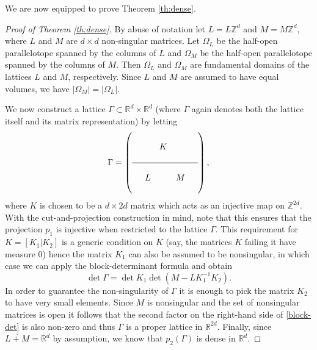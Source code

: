 \documentclass[12pt,a4paper,oneside]{amsart}
\theoremstyle{plain}
\theoremstyle{definition}
\newcommand{\RR}{{\mathbb R}}
\newcounter{rem}
\begin{document}
We are now equipped to prove Theorem \ref{th:dense}.
\begin{proof}[Proof of Theorem \ref{th:dense}]
By abuse of notation let $L=L\mathbb{Z}^d$ and $M=M\mathbb{Z}^d$, where $L$ and $M$ are $d\times d$ non-singular matrices. Let $\Omega_L$ be the half-open parallelotope spanned by the columns of $L$ and $\Omega_M$ be the half-open parallelotope spanned by the columns of $M$. Then $\Omega_L$ and $\Omega_M$ are fundamental domains of the lattices $L$ and $M$, respectively. Since $L$ and $M$ are assumed to have equal volumes, we have $|\Omega_M| = |\Omega_L|$.

We now construct a lattice $\Gamma \subset \mathbb{R}^d \times \mathbb{R}^d$ (where $\Gamma$ again denotes both the lattice itself and its matrix representation) by letting
\begin{equation*}
\Gamma = 
\left(
\begin{array}{c c c c c}
\\
& & K & & \\
\\
 \hline
 \\
& L &  & M & \\ 
 \\
\end{array}
\right),
\end{equation*}
where $K$ is chosen to be a $d \times 2d$ matrix which acts as an injective map on $\mathbb{Z}^{2d}$. With the cut-and-projection construction in mind, note that this ensures that the projection $p_1$ is injective when restricted to the lattice $\Gamma$. This requirement for $K = [K_1 | K_2]$ is a generic condition on $K$ (say, the matrices $K$ failing it have measure $0$) hence the matrix $K_1$ can also be assumed to be nonsingular, in which case we can apply the block-determinant formula and obtain
\begin{equation}\label{block-det}
\det\Gamma = \det K_1 \det(M-L K_1^{-1} K_2).
\end{equation}
In order to guarantee the non-singularity of $\Gamma$ it is enough to pick the matrix $K_2$ to have very small elements. Since $M$ is nonsingular and the set of nonsingular matrices is open it follows that the second factor on the right-hand side of  \eqref{block-det} is also non-zero and thus $\Gamma$ is a proper lattice in $\RR^{2d}$. Finally, since $\overline{L+M}=\mathbb{R}^d$ by assumption, we know that $p_2(\Gamma)$ is dense in $\mathbb{R}^d$.



\end{proof}
\end{document}
